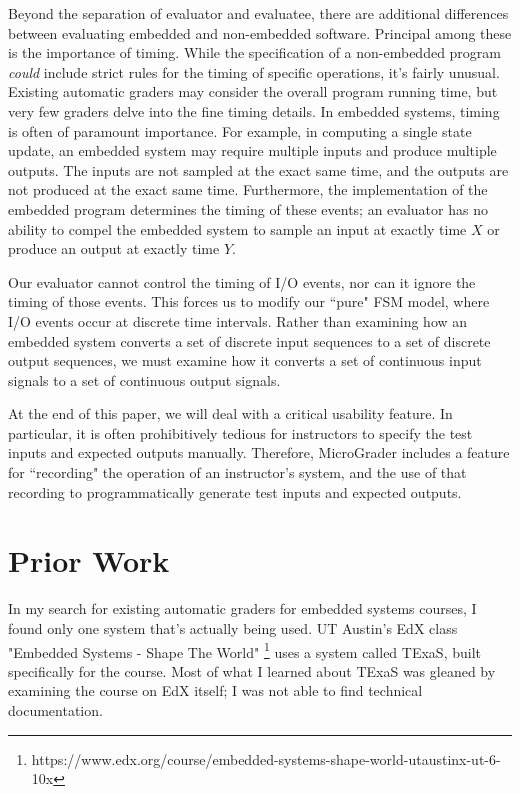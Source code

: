 \documentclass[12pt]{article}
\begin{document}
Beyond the separation of evaluator and evaluatee, there are additional differences between evaluating embedded and non-embedded software.  Principal among these is the importance of timing.  While the specification of a non-embedded program \textit{could} include strict rules for the timing of specific operations, it's fairly unusual.  Existing automatic graders may consider the overall program running time, but very few graders delve into the fine timing details. In embedded systems, timing is often of paramount importance.  For example, in computing a single state update, an embedded system may require multiple inputs and produce multiple outputs.  The inputs are not sampled at the exact same time, and the outputs are not produced at the exact same time.  Furthermore, the implementation of the embedded program determines the timing of these events; an evaluator has no ability to compel the embedded system to sample an input at exactly time $X$ or produce an output at exactly time $Y$.

Our evaluator cannot control the timing of I/O events, nor can it ignore the timing of those events.  This forces us to modify our ``pure" FSM model, where I/O events occur at discrete time intervals.  Rather than examining how an embedded system converts a set of discrete input sequences to a set of discrete output sequences, we must examine how it converts a set of continuous input signals to a set of continuous output signals.

At the end of this paper, we will deal with a critical usability feature.  In particular, it is often prohibitively tedious for instructors to specify the test inputs and expected outputs manually.  Therefore, MicroGrader includes a feature for ``recording" the operation of an instructor's system, and the use of that recording to programmatically generate test inputs and expected outputs. 


\newpage
\section{Prior Work}
In my search for existing automatic graders for embedded systems courses, I found only one system that's actually being used.  UT Austin's EdX class "Embedded Systems - Shape The World" \footnote{https://www.edx.org/course/embedded-systems-shape-world-utaustinx-ut-6-10x} uses a system called TExaS, built specifically for the course.  Most of what I learned about TExaS was gleaned by examining the course on EdX itself; I was not able to find technical documentation.
\end{document}
